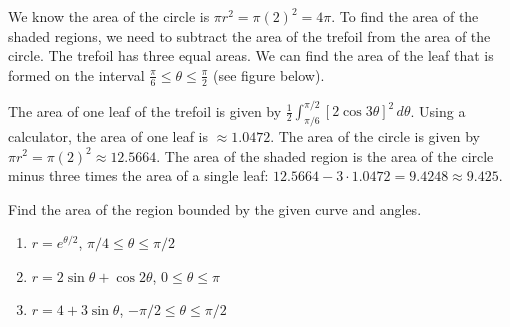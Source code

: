 \begin{Answer}[ref = polar2]
We know the area of the circle is $\pi r^2 = \pi(2)^2 = 4\pi$. To find the 
area of the shaded regions, we need to subtract the area of the trefoil from 
the area of the circle. The trefoil has three equal areas. We can find the 
area of the leaf that is formed on the interval $\frac{\pi}{6} \leq \theta 
\leq \frac{\pi}{2}$ (see figure below).

\begin{center}
\end{center}

The area of one leaf of the trefoil is given by $\frac{1}{2} \int_{\pi/6}^{
\pi/2} \left[2\cos{3\theta} \right]^2\,d\theta$. Using a calculator, the area 
of one leaf is $\approx 1.0472$. The area of the circle is given by $\pi r^2 = 
\pi (2)^2 \approx 12.5664$. The area of the shaded region is the area of 
the circle minus three times the area of a single leaf: $12.5664 - 3 \cdot 
1.0472 = 9.4248 \approx 9.425$. 
\end{Answer}

\begin{Exercise}[label = polar4]
Find the area of the region bounded by the given curve and angles. 
\begin{enumerate}
\item $r = e^{\theta/2}$, $\pi/4 \leq \theta \leq \pi/2$
\item $r = 2\sin{\theta} + \cos{2\theta}$, $0 \leq \theta \leq \pi$
\item $r = 4 + 3\sin{\theta}$, $-\pi/2 \leq \theta \leq \pi/2$
\end{enumerate}
\end{Exercise}

